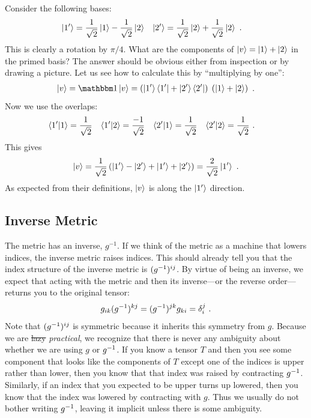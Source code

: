 \documentclass[12pt]{article}
\begin{document}
\begin{example}
Consider the following bases:
\begin{align}
    \left|1'\right\rangle &= \frac{1}{\sqrt{2}}\left|1\right\rangle - \frac{1}{\sqrt{2}}\left|2\right\rangle
    &
    \left|2'\right\rangle &= \frac{1}{\sqrt{2}}\left|2\right\rangle + \frac{1}{\sqrt{2}}\left|2\right\rangle \ .
\end{align}
This is clearly a rotation by $\pi/4$. What are the components of $\left|v\right\rangle = \left|1\right\rangle + \left|2\right\rangle$ in the primed basis? The answer should be obvious either from inspection or by drawing a picture. Let us see how to calculate this by ``multiplying by one'':
\begin{align}
    \ket{v} = \one\ket{v} = \left(\ket{1'}\bra{1'} + \ket{2'}\bra{2'}\right)\; \left(\ket{1} + \ket{2}\right) \ .
\end{align}
Now we use the overlaps:
\begin{align}
    \langle 1' | 1 \rangle &= \frac{1}{\sqrt{2}}
    &
    \langle 1' | 2 \rangle &= \frac{-1}{\sqrt{2}}
    &
    \langle 2' | 1 \rangle &= \frac{1}{\sqrt{2}}
    &
    \langle 2' | 2 \rangle &= \frac{1}{\sqrt{2}} \ .
\end{align}
This gives  
\begin{align}
    \left|v\right\rangle = \frac{1}{\sqrt{2}}
    \left(
        \left|1'\right\rangle - \left|2'\right\rangle + \left|1'\right\rangle + \left|2'\right\rangle
    \right)
    = 
    \frac{2}{\sqrt{2}}\left|1'\right\rangle \ .
\end{align}
As expected from their definitions, $\left|v\right\rangle$ is along the $\left|1'\right\rangle$ direction.
\end{example}

\subsection{Inverse Metric}

The metric has an inverse, $g^{-1}$.  If we think of the metric as a machine that lowers indices, the inverse metric raises indices. This should already tell you that the index structure of the inverse metric is $(g^{-1})^{ij}$. By virtue of being an inverse, we expect that acting with the metric and then its inverse---or the reverse order---returns you to the original tensor:
\begin{align}
    g_{ik}(g^{-1})^{kj} = (g^{-1})^{jk}g_{ki} = \delta^j_i \ .
\end{align}
Note that $(g^{-1})^{ij}$ is symmetric because it inherits this symmetry from $g$. Because we are \sout{lazy} \emph{practical}, we recognize that there is never any ambiguity about whether we are using $g$ or $g^{-1}$. If you know a tensor $T$ and then you see some component that looks like the components of $T$ except one of the indices is upper rather than lower, then you know that that index was raised by contracting $g^{-1}$. Similarly, if an index that you expected to be upper turns up lowered, then you know that the index was lowered by contracting with $g$. Thus we usually do not bother writing $g^{-1}$, leaving it implicit unless there is some ambiguity.
\end{document}

